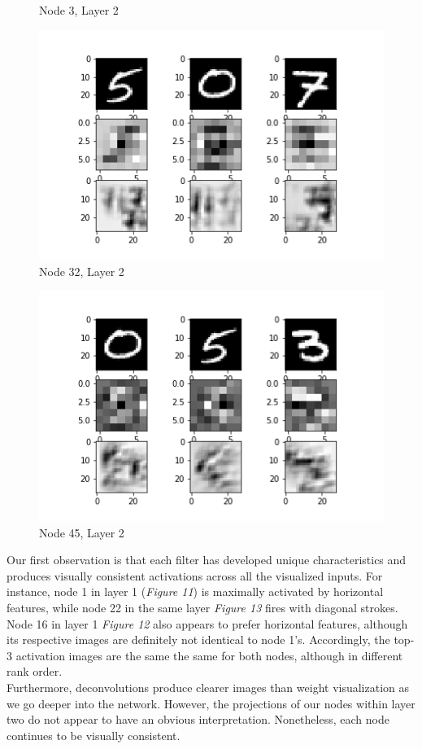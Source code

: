 \documentclass[12pt]{article}
\begin{document}
\begin{center}
\begin{figure}[H]
			\caption{Node 3, Layer 2}
			\label{fig:node3layer2mnist}
		\end{figure}
	\begin{figure}[H]
		\centering
		\includegraphics[width=0.6\linewidth]{../diagrams/node32_layer2_mnist}
		\caption{Node 32, Layer 2}
		\label{fig:node32layer2mnist}
	\end{figure}
	\begin{figure}[H]
		\centering
		\includegraphics[width=0.6\linewidth]{../diagrams/node45_layer2_mnist}
		\caption{Node 45, Layer 2}
		\label{fig:node45layer2mnist}
	\end{figure}
\end{center}

Our first observation is that each filter has developed unique characteristics and produces visually consistent activations across all the visualized inputs. For instance, node 1 in layer 1 (\textit{Figure 11})  is maximally activated by horizontal features, while node 22 in the same layer \textit{Figure 13} fires with diagonal strokes. Node 16 in layer 1 \textit{Figure 12} also appears to prefer horizontal features, although its respective images are definitely not identical to node 1's. Accordingly, the top-3 activation images are the same the same for both nodes, although in different rank order.  \\

Furthermore, deconvolutions produce clearer images than weight visualization as we go deeper into the network. However, the projections of our nodes within layer two do not appear to have an obvious interpretation. Nonetheless, each node continues to be visually consistent.
\end{document}
